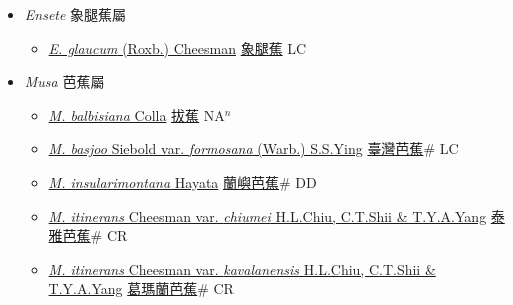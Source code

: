 
  \begin{itemize}
 \item[] \textit{Ensete} 象腿蕉屬
                    
  \begin{itemize}
        \item[] \href{http://www.theplantlist.org/tpl1.1/search?q=Ensete+glaucum}{\textit{E. glaucum} (Roxb.) Cheesman}   \href{\detokenize{http://taibnet.sinica.edu.tw/chi/taibnet_species_list.php?T2=象腿蕉&T2_new_value=true&fr=y}}{象腿蕉} LC
  \end{itemize}
 \item[] \textit{Musa} 芭蕉屬
                    
  \begin{itemize}
        \item[] \href{http://www.theplantlist.org/tpl1.1/search?q=Musa+balbisiana}{\textit{M. balbisiana} Colla}   \href{\detokenize{http://taibnet.sinica.edu.tw/chi/taibnet_species_list.php?T2=拔蕉&T2_new_value=true&fr=y}}{拔蕉} NA$^n$
        \item[] \href{http://www.theplantlist.org/tpl1.1/search?q=Musa+basjoo+var.+formosana}{\textit{M. basjoo} Siebold var. \textit{formosana} (Warb.) S.S.Ying}   \href{\detokenize{http://taibnet.sinica.edu.tw/chi/taibnet_species_list.php?T2=臺灣芭蕉&T2_new_value=true&fr=y}}{臺灣芭蕉}\# LC
        \item[] \href{http://www.theplantlist.org/tpl1.1/search?q=Musa+insularimontana}{\textit{M. insularimontana} Hayata}   \href{\detokenize{http://taibnet.sinica.edu.tw/chi/taibnet_species_list.php?T2=蘭嶼芭蕉&T2_new_value=true&fr=y}}{蘭嶼芭蕉}\# DD
        \item[] \href{http://www.theplantlist.org/tpl1.1/search?q=Musa+itinerans+var.+chiumei}{\textit{M. itinerans} Cheesman var. \textit{chiumei} H.L.Chiu, C.T.Shii \& T.Y.A.Yang}   \href{\detokenize{http://taibnet.sinica.edu.tw/chi/taibnet_species_list.php?T2=泰雅芭蕉&T2_new_value=true&fr=y}}{泰雅芭蕉}\# CR
        \item[] \href{http://www.theplantlist.org/tpl1.1/search?q=Musa+itinerans+var.+kavalanensis}{\textit{M. itinerans} Cheesman var. \textit{kavalanensis} H.L.Chiu, C.T.Shii \& T.Y.A.Yang}   \href{\detokenize{http://taibnet.sinica.edu.tw/chi/taibnet_species_list.php?T2=葛瑪蘭芭蕉&T2_new_value=true&fr=y}}{葛瑪蘭芭蕉}\# CR

\end{itemize}
\end{itemize}
